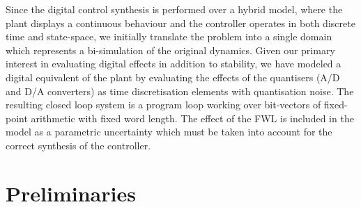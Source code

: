\documentclass{sig-alternate-05-2015}
\begin{document}
Since the digital control synthesis is performed over a hybrid model, where
the plant displays a continuous behaviour and the controller operates in
both discrete time and state-space, we initially translate the problem into
a single domain which represents a bi-simulation of the original dynamics. 
Given our primary interest in evaluating digital effects in addition to
stability, we have modeled a digital equivalent of the plant by evaluating
the effects of the quantisers (A/D and D/A converters) as time
discretisation elements with quantisation noise.  The resulting closed loop
system is a program loop working over bit-vectors of fixed-point arithmetic
with fixed word length.  The effect of the FWL is included in the model as a
parametric uncertainty which must be taken into account for the correct
synthesis of the controller.





\section{Preliminaries}
\end{document}
